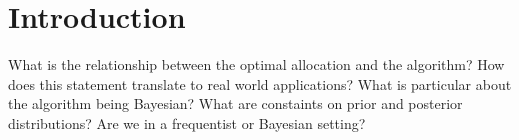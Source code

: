 \newcommand{\package}{\emph}

\chapter{Introduction}

What is the relationship between the optimal allocation and the algorithm?
How does this statement translate to real world applications?
What is particular about the algorithm being Bayesian?
What are constaints on prior and posterior distributions?
Are we in a frequentist or Bayesian setting?
